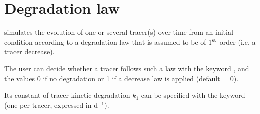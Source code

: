 \chapter{Degradation law}

\waqtel simulates the evolution of one or several tracer(s)
over time from an initial condition according to a degradation law
that is assumed to be of 1$^{\rm{st}}$ order (i.e. a tracer decrease).

The user can decide whether a tracer follows such a law
with the keyword ,
and the values 0 if no degradation or 1 if a decrease law
is applied (default = 0).

Its constant of tracer kinetic degradation $k_1$ can be specified
with the keyword 
(one per tracer, expressed in d$^{-1}$).
